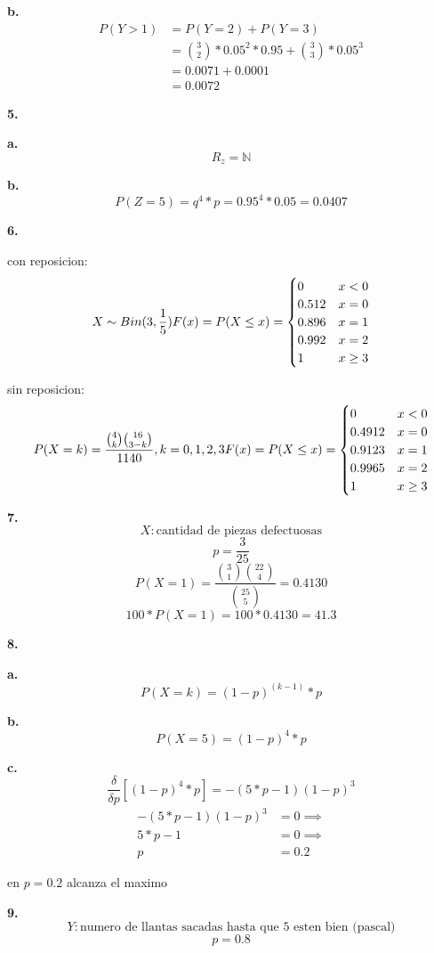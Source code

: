 \documentclass[12pt,fleqn]{article}
\begin{document}
\textbf{b.}
\begin{align*}
  P(Y>1)&=P(Y=2)+P(Y=3)\\
        &=\binom{3}{2}*0.05^2*0.95+\binom{3}{3}*0.05^3\\
        &=0.0071+0.0001\\
        &=0.0072
\end{align*}

\textbf{5.}

\textbf{a.}
\[R_z=\mathbb{N}\]

\textbf{b.}
\[P(Z=5)=q^4*p=0.95^4*0.05=0.0407\]

\textbf{6.}

con reposicion:
\[X \sim Bin(3,\frac{1}{5})\\
  F(x)=P(X \le x)=\begin{cases}
    0&x<0\\
    0.512&x=0\\
    0.896&x=1\\
    0.992&x=2\\
    1&x \ge 3
  \end{cases}
\]

sin reposicion:
\[P(X=k)=\frac{\binom{4}{k}\binom{16}{3-k}}{1140}, k=0,1,2,3\\
  F(x)=P(X \le x)=\begin{cases}
    0&x<0\\
    0.4912&x=0\\
    0.9123&x=1\\
    0.9965&x=2\\
    1&x \ge 3
  \end{cases}
\]

\textbf{7.}
\[X: \textrm{cantidad de piezas defectuosas}\]
\[p=\frac{3}{25}\]
\[P(X=1)=\frac{\binom{3}{1}\binom{22}{4}}{\binom{25}{5}}=0.4130\]
\[100*P(X=1)=100*0.4130=41.3\]

\textbf{8.}

\textbf{a.}
\[P(X=k)=(1-p)^{(k-1)}*p\]

\textbf{b.}
\[P(X=5)=(1-p)^4*p\]

\textbf{c.}
\[\frac{\delta}{\delta p}[(1-p)^4*p]=-(5*p-1)(1-p)^3\]
\begin{align*}
  -(5*p-1)(1-p)^3&=0\implies\\
  5*p-1&=0\implies\\
  p&=0.2
\end{align*}

en $p=0.2$ alcanza el maximo

\textbf{9.}
\[Y: \textrm{numero de llantas sacadas hasta que 5 esten bien (pascal)}\]
\[p=0.8\]
\end{document}
